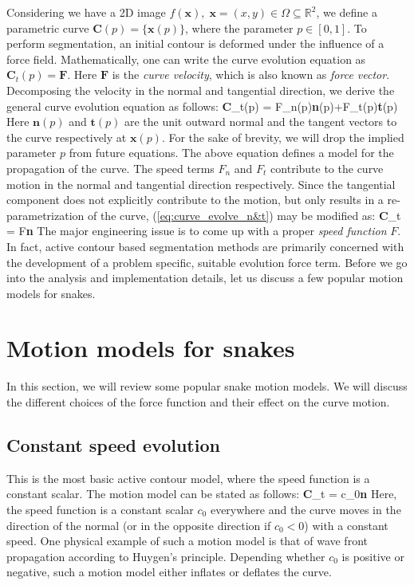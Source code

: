 Considering we have a 2D image $f(\textbf{x}),\;\textbf{x}=(x,y)\in\Omega\subseteq\mathbb{R}^2$, we define a parametric curve $\textbf{C}(p)=\{\textbf{x}(p)\}$, where the parameter $p\in\left[0,1\right]$. To perform segmentation, an initial contour is deformed under the influence of a force field. Mathematically, one can write the curve evolution equation as $\textbf{C}_t(p)=\textbf{F}$. Here $\textbf{F}$ is the \textit{curve velocity}, which is also known as \textit{force vector}. Decomposing the velocity in the normal and tangential direction, we derive the general curve evolution equation as follows:
\bea
\textbf{C}_t(p) = F_n(p)\textbf{n}(p)+F_t(p)\textbf{t}(p)
\label{eq:curve_evolve_n&t}
\eea
Here $\textbf{n}(p)$ and $\textbf{t}(p)$ are the unit outward normal and the tangent vectors to the curve respectively at $\textbf{x}(p)$. For the sake of brevity, we will drop the implied parameter $p$ from  future equations. The above equation defines a model for the propagation of the curve. The speed terms $F_n$ and $F_t$ contribute to the curve motion in the normal and tangential direction respectively. Since the tangential component does not explicitly contribute to the motion, but only results in a re-parametrization of the curve, (\ref{eq:curve_evolve_n&t}) may be modified as:
\bea
\textbf{C}_t = F\textbf{n}
\label{eq:curve_evolve_general}
\eea
The major engineering issue is to come up with a proper \textit{speed function} $F$. In fact, active contour based segmentation methods are primarily concerned with the development of a problem specific, suitable evolution force term. Before we go into the analysis and implementation details, let us discuss a few popular motion models for snakes.

\section{Motion models for snakes} 

In this section, we will review some popular snake motion models. We will discuss the different choices of  the force function and their effect on the curve motion.
\subsection{Constant speed evolution}
This is the most basic active contour model, where the speed function is a constant scalar. The motion model can be stated as follows:
\bea
\textbf{C}_t = c_0\;\textbf{n}
\label{eq:const_speed}
\eea
Here, the speed function is a constant scalar $c_0$ everywhere and the curve moves in the direction of the normal (or in the opposite direction if $c_0<0$) with a constant speed. One physical example of such a motion model is that of wave front propagation according to Huygen's principle. Depending whether $c_0$ is positive or negative, such a motion model either inflates or deflates the curve. 

